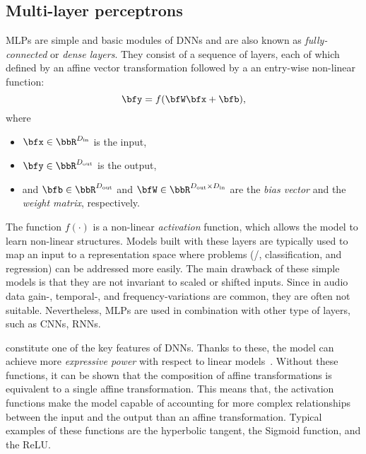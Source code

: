 \subsection{Multi-layer perceptrons}\label{subsec:lantern:mlp}
\acfp{MLP} are simple and basic modules of \acp{DNN} and are also known as \textit{fully-connected} or \textit{dense layers}.
They consist of a sequence of layers, each of which defined by an affine vector transformation followed by a an entry-wise non-linear function:
\begin{equation*}
    \bfy = f(\bfW \bfx + \bfb)
    ,
\end{equation*}
where
\newcommand{\Din}{\ensuremath{D_{\text{in}}}}
\newcommand{\Dout}{\ensuremath{D_{\text{out}}}}
\begin{itemize}
    \item $\bfx\in\bbR^{\Din}$ is the input,
    \item $\bfy\in\bbR^{\Dout}$ is the output,
    \item and $\bfb\in\bbR^{\Dout}$ and $\bfW\in\bbR^{\Dout \times \Din}$ are the \textit{bias vector} and the \textit{weight matrix}, respectively.
\end{itemize}
The function $f(\cdot)$ is a non-linear \textit{activation} function, which allows the model to learn non-linear structures.
Models built with these layers are typically used to map an input to a representation space where problems (\eg/, classification, and regression) can be addressed more easily.
The main drawback of these simple models is that they are not invariant to scaled or shifted inputs.
Since in audio data gain-, temporal-, and frequency-variations are common, they are often not suitable.
Nevertheless, \acp{MLP} are used in combination with other type of layers, such as \acfp{CNN}, \acfp{RNN}.

 constitute one of the key features of \acp{DNN}.
Thanks to these, the model can achieve more \textit{expressive power} with respect to linear models~.
Without these functions, it can be shown that the composition of affine transformations is equivalent to a single affine transformation.
This means that, the activation functions make the model capable of accounting for more complex relationships between the input and the output than an affine transformation.
Typical examples of these functions are the hyperbolic tangent, the Sigmoid function, and the \acf{ReLU}.

